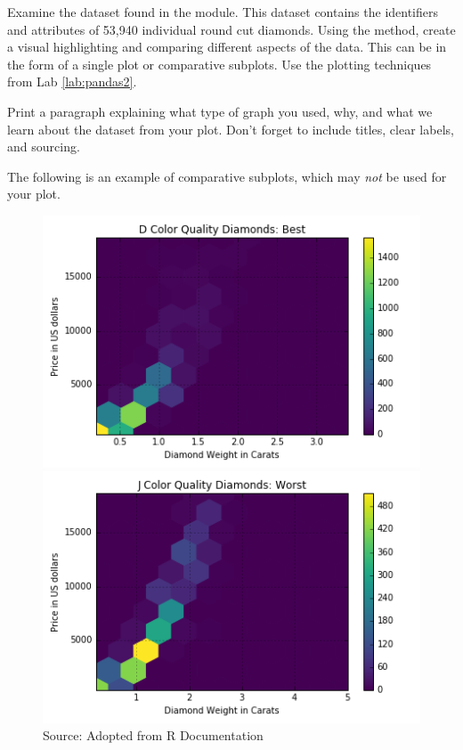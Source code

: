 \begin{problem} 
Examine the  dataset found in the  module. 
This dataset contains the identifiers and attributes of 53,940  individual round cut diamonds. 
Using the  method, create a visual highlighting and comparing different aspects of the data.
This can be in the form of a single plot or comparative subplots.  Use the plotting techniques from Lab \ref{lab:pandas2}.

Print a paragraph explaining what type of graph you used, why, and what we learn about the dataset from your plot.
Don't forget to include titles, clear labels, and sourcing. 

The following is an example of comparative subplots, which may \emph{not} be used for your plot.
\begin{figure}[H] %
    \centering
    \begin{minipage}[b]{0.48\textwidth}
    \includegraphics[width=\textwidth]{DiamondD.png}
    \end{minipage}
    \quad
    \begin{minipage}[b]{0.48\textwidth}
    \includegraphics[width=\textwidth]{DiamondJ.png}
    \end{minipage}
    \caption{Source: Adopted from R Documentation}
    \label{fig:intro2}
\end{figure}


\end{problem}
